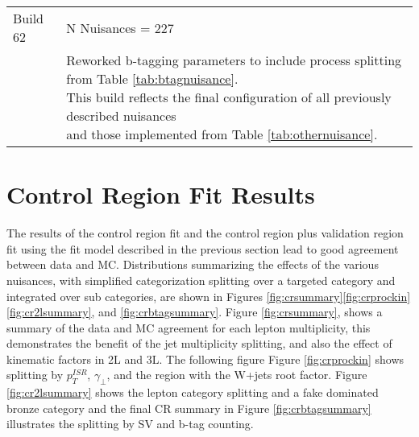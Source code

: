 \begin{table}
\begin{tabular}{ll}
 & \\
\hline 
Build 62 & N Nuisances = 227 \\
\hline
 & \makecell[l]{Reworked b-tagging parameters to include process splitting from Table \ref{tab:btagnuisance}. \\ This build reflects the final configuration of all previously described nuisances \\ and those implemented from Table \ref{tab:othernuisance}. } \\
\end{tabular} 
\label{tab:builds}
\end{table}
\section{Control Region Fit Results}
The results of the control region fit and the control region plus validation region fit using the fit model described in the previous section lead to good agreement between data and MC. Distributions summarizing the effects of the various nuisances, with simplified categorization splitting over a targeted category and integrated over sub categories, are shown in Figures \ref{fig:crsummary}\ref{fig:crprockin}\ref{fig:cr2lsummary}, and \ref{fig:crbtagsummary}. Figure \ref{fig:crsummary}, shows a summary of the data and MC agreement for each lepton multiplicity, this demonstrates the benefit of the jet multiplicity splitting, and also the effect of kinematic factors in 2L and 3L. The following figure Figure \ref{fig:crprockin} shows splitting by $p_T^{ISR}$, $\gamma_\perp$, and the region with the W+jets root factor. Figure \ref{fig:cr2lsummary} shows the lepton category splitting and a fake dominated bronze category and the final CR summary in Figure \ref{fig:crbtagsummary} illustrates the splitting by SV and b-tag counting.



